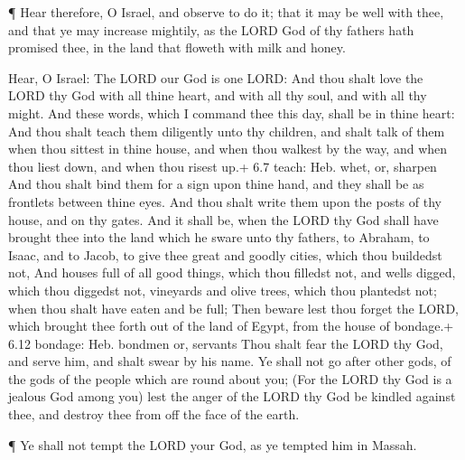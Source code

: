  ¶ Hear therefore, O Israel, and observe to do it; that it
may be well with thee, and that ye may increase mightily, as the LORD
God of thy fathers hath promised thee, in the land that floweth with
milk and honey.

 Hear, O Israel: The LORD our God is one LORD: 
And thou shalt love the LORD thy God with all thine heart, and with all
thy soul, and with all thy might.  And these words, which I
command thee this day, shall be in thine heart:  And thou
shalt teach them diligently unto thy children, and shalt talk of them
when thou sittest in thine house, and when thou walkest by the way, and
when thou liest down, and when thou risest up.+ 6.7 teach: Heb. whet,
or, sharpen  And thou shalt bind them for a sign upon thine
hand, and they shall be as frontlets between thine eyes. 
And thou shalt write them upon the posts of thy house, and on thy gates.
 And it shall be, when the LORD thy God shall have brought
thee into the land which he sware unto thy fathers, to Abraham, to
Isaac, and to Jacob, to give thee great and goodly cities, which thou
buildedst not,  And houses full of all good things, which
thou filledst not, and wells digged, which thou diggedst not, vineyards
and olive trees, which thou plantedst not; when thou shalt have eaten
and be full;  Then beware lest thou forget the LORD, which
brought thee forth out of the land of Egypt, from the house of bondage.+
6.12 bondage: Heb. bondmen or, servants  Thou shalt fear
the LORD thy God, and serve him, and shalt swear by his name.
 Ye shall not go after other gods, of the gods of the
people which are round about you;  (For the LORD thy God is
a jealous God among you) lest the anger of the LORD thy God be kindled
against thee, and destroy thee from off the face of the earth.

 ¶ Ye shall not tempt the LORD your God, as ye tempted him
in Massah.

